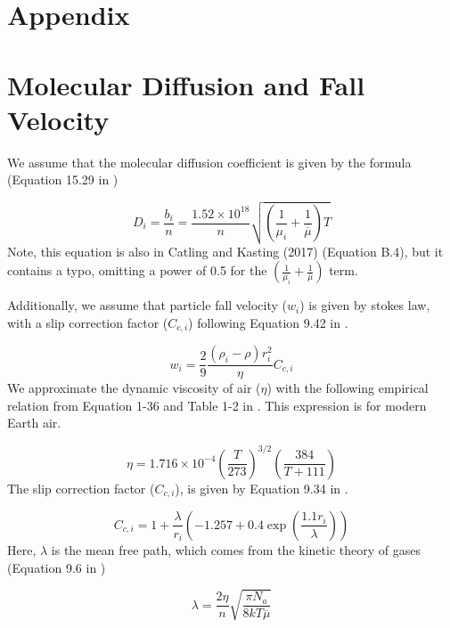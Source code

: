 \documentclass{article}
\begin{document}
\appendix
\section*{Appendix}

\section{Molecular Diffusion and Fall Velocity}

We assume that the molecular diffusion coefficient is given by the formula (Equation 15.29 in \cite{Banks_2013})

\begin{equation} \label{eq:molec_diffusion_coeff}
  D_i = 
  \frac{b_i}{n} = \frac{1.52 \times 10^{18}}{n} \sqrt{\left( \frac{1}{\mu_i} + \frac{1}{\overline{\mu}} \right) T}
\end{equation}
Note, this equation is also in Catling and Kasting (2017) \cite{Catling_2017} (Equation B.4), but it contains a typo, omitting a power of 0.5 for the $\left( \frac{1}{\mu_i} + \frac{1}{\overline{\mu}} \right)$ term.

Additionally, we assume that particle fall velocity ($w_i$) is given by stokes law, with a slip correction factor ($C_{c,i}$) following Equation 9.42 in \cite{Seinfeld_2006}.

\begin{equation} \label{eq:stokes_law}
  w_i = \frac{2}{9} \frac{(\rho_i - \rho)r_i^2}{\eta} C_{c,i}
\end{equation}
We approximate the dynamic viscosity of air ($\eta$) with the following empirical relation from Equation 1-36 and Table 1-2 in \cite{White_2006}. This expression is for modern Earth air.

\begin{equation} \label{eq:dynamic_viscosity}
  \eta = 1.716 \times 10^{-4} \left(\frac{T}{273}\right)^{3/2} \left( \frac{384}{T + 111} \right)
\end{equation}
The slip correction factor ($C_{c,i}$), is given by Equation 9.34 in \cite{Seinfeld_2006}.

\begin{equation} \label{eq:slip_correction}
  C_{c,i} = 1 + \frac{\lambda}{r_i}\left( -1.257 + 0.4 \exp \left(\frac{1.1 r_i}{\lambda}\right) \right)
\end{equation}
Here, $\lambda$ is the mean free path, which comes from the kinetic theory of gases (Equation 9.6 in \cite{Seinfeld_2006})

\begin{equation}
  \lambda = \frac{2 \eta}{n} \sqrt{\frac{\pi N_a}{8 k T \overline{\mu}}}
\end{equation}





\end{document}
